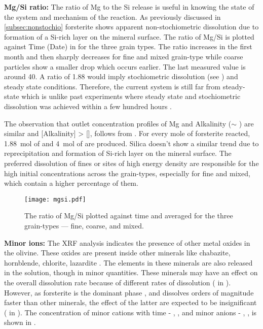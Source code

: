 \noindent \textbf{Mg/Si ratio:} The ratio of Mg to the Si release is useful in knowing the state of the system and mechanism of the reaction. As previously discussed in \cref{subsec:nonstochio} forsterite shows apparent non-stochiometric dissolution due to formation of a Si-rich layer on the mineral surface. The ratio of Mg/Si is plotted against Time (Date) in  for the three grain types. The ratio increases in the first month and then sharply decreases for fine and mixed grain-type while coarse particles show a smaller drop which occurs earlier. The last measured value is around \num{40}. A ratio of 1.88 would imply stochiometric dissolution (see ) and steady state conditions. Therefore, the current system is still far from steady-state which is unlike past experiments where steady state and stochiometric dissolution was achieved within a few hundred hours\; \citep{hellmann2012,pokrovsky2000,wogelius1992}.

The observation that outlet concentration profiles of Mg and Alkalinity ($\sim$ ) are similar and [Alkalinity] > [], follows from . For every mole of forsterite reacted, \SI{1.88}{\mole} of  and \SI{4}{\mole} of  are produced. Silica doesn't show a similar trend due to reprecipitation and formation of Si-rich layer on the mineral surface. The preferred dissolution of fines or sites of high energy density are responsible for the high initial concentrations across the grain-types, especially for fine and mixed, which contain a higher percentage of them. \\
\begin{figure}[h]
\centering
\texttt{[image: mgsi.pdf]}
\caption{The ratio of Mg/Si plotted against time and averaged for the three grain-types --- fine, coarse, and mixed.}
\label{fig:results_mgsi}
\end{figure}

\noindent \textbf{Minor ions:} The XRF analysis indicates the presence of other metal oxides in the olivine. These oxides are present inside other minerals like chabazite, hornblende, chlorite, lazardite \citep{marvin}. The elements in these minerals are also released in the solution, though in minor quantities. These minerals may have an effect on the overall dissolution rate because of different rates of dissolution (\citep{schott1981} in \cite{awad2000}). However, as forsterite is the dominant phase \citep{marvin}, and dissolves orders of magnitude faster than other minerals, the effect of the latter are expected to be insignificant (\citep{schott1985} in \cite{awad2000}). The concentration of minor cations with time - , ,  and minor anions - , ,  is shown in\; .

